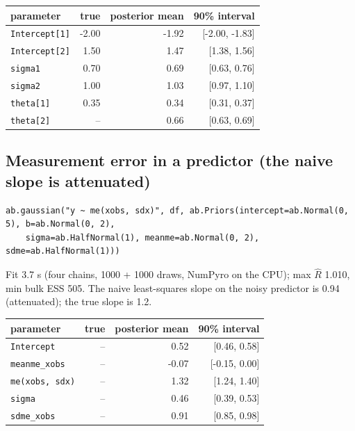 \documentclass[11pt]{article}
\newcommand{\code}[1]{\texttt{#1}}
\begin{document}
\begin{center}\begin{tabular}{@{}lrrr@{}}\toprule parameter & true & posterior mean & 90\% interval \\ \midrule
\code{Intercept[1]} & -2.00 & -1.92 & [-2.00, -1.83] \\
\code{Intercept[2]} & 1.50 & 1.47 & [1.38, 1.56] \\
\code{sigma1} & 0.70 & 0.69 & [0.63, 0.76] \\
\code{sigma2} & 1.00 & 1.03 & [0.97, 1.10] \\
\code{theta[1]} & 0.35 & 0.34 & [0.31, 0.37] \\
\code{theta[2]} & -- & 0.66 & [0.63, 0.69] \\
\bottomrule\end{tabular}\end{center}\normalsize

\subsection*{Measurement error in a predictor (the naive slope is attenuated)}
\begin{lstlisting}
ab.gaussian("y ~ me(xobs, sdx)", df, ab.Priors(intercept=ab.Normal(0, 5), b=ab.Normal(0, 2),
    sigma=ab.HalfNormal(1), meanme=ab.Normal(0, 2), sdme=ab.HalfNormal(1)))
\end{lstlisting}
\noindent\small Fit 3.7 s (four chains, 1000 + 1000 draws, NumPyro on the CPU); max $\hat R$ 1.010, min bulk ESS 505. The naive least-squares slope on the noisy predictor is 0.94 (attenuated); the true slope is 1.2.

\begin{center}\begin{tabular}{@{}lrrr@{}}\toprule parameter & true & posterior mean & 90\% interval \\ \midrule
\code{Intercept} & -- & 0.52 & [0.46, 0.58] \\
\code{meanme\_xobs} & -- & -0.07 & [-0.15, 0.00] \\
\code{me(xobs, sdx)} & -- & 1.32 & [1.24, 1.40] \\
\code{sigma} & -- & 0.46 & [0.39, 0.53] \\
\code{sdme\_xobs} & -- & 0.91 & [0.85, 0.98] \\
\bottomrule\end{tabular}\end{center}\normalsize
\end{document}
